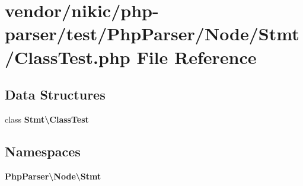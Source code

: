 \section{vendor/nikic/php-\/parser/test/\+Php\+Parser/\+Node/\+Stmt/\+Class\+Test.php File Reference}
\label{nikic_2php-parser_2test_2_php_parser_2_node_2_stmt_2_class_test_8php}
\subsection*{Data Structures}
\begin{DoxyCompactItemize}
\item 
class {\bf Stmt\textbackslash{}\+Class\+Test}
\end{DoxyCompactItemize}
\subsection*{Namespaces}
\begin{DoxyCompactItemize}
\item 
 {\bf Php\+Parser\textbackslash{}\+Node\textbackslash{}\+Stmt}
\end{DoxyCompactItemize}
